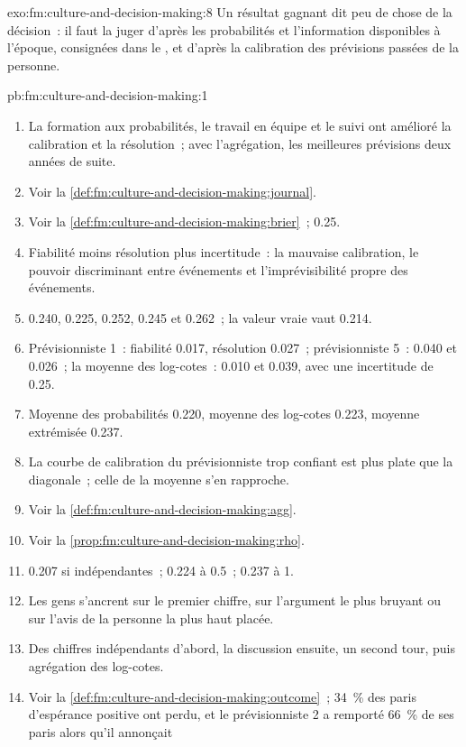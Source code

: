 \begin{solution}{exo:fm:culture-and-decision-making:8}
Un résultat gagnant dit peu de chose de la décision~: il faut la juger d'après les probabilités et l'information disponibles à l'époque, consignées dans le , et d'après la
calibration des prévisions passées de la personne.
\end{solution}

\begin{solution}{pb:fm:culture-and-decision-making:1}
\begin{enumerate}
\item La formation aux probabilités, le travail en équipe et le suivi ont amélioré la calibration et la résolution~; avec l'agrégation, les meilleures prévisions deux années de suite.
\item Voir la \cref{def:fm:culture-and-decision-making:journal}.
\item Voir la \cref{def:fm:culture-and-decision-making:brier}~; 0.25.
\item Fiabilité moins résolution plus incertitude~: la mauvaise calibration, le pouvoir discriminant entre événements et l'imprévisibilité propre des événements.
\item 0.240, 0.225, 0.252, 0.245 et 0.262~; la valeur vraie vaut 0.214.
\item Prévisionniste 1~: fiabilité 0.017, résolution 0.027~; prévisionniste 5~: 0.040 et 0.026~; la moyenne des log-cotes~: 0.010 et 0.039, avec une incertitude de 0.25.
\item Moyenne des probabilités 0.220, moyenne des log-cotes 0.223, moyenne extrémisée 0.237.
\item La courbe de calibration du prévisionniste trop confiant est plus plate que la diagonale~; celle de la moyenne s'en rapproche.
\item Voir la \cref{def:fm:culture-and-decision-making:agg}.
\item Voir la \cref{prop:fm:culture-and-decision-making:rho}.
\item 0.207 si indépendantes~; 0.224 à 0.5~; 0.237 à 1.
\item Les gens s'ancrent sur le premier chiffre, sur l'argument le plus bruyant ou sur l'avis de la personne la plus haut placée.
\item Des chiffres indépendants d'abord, la discussion ensuite, un second tour, puis agrégation des log-cotes.
\item Voir la \cref{def:fm:culture-and-decision-making:outcome}~; 34~\% des paris d'espérance positive ont perdu, et le prévisionniste 2 a remporté 66~\% de ses paris alors qu'il annonçait

\end{enumerate}
\end{solution}
